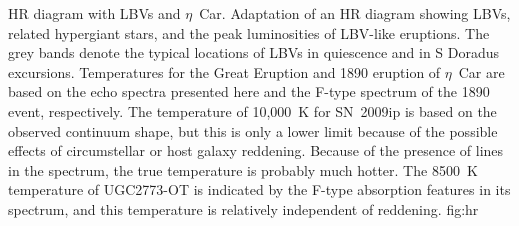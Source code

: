 {HR diagram with LBVs and $\eta$~Car.
Adaptation\cite{Smith04} of an HR diagram showing LBVs, related
hypergiant stars, and the peak luminosities of LBV-like eruptions. The
grey bands denote the typical locations of LBVs in quiescence and in S
Doradus excursions.  Temperatures for the Great Eruption and 1890
eruption of $\eta$~Car are based on the echo spectra presented here
and the F-type spectrum of the 1890 event\cite{Walborn77},
respectively.
The temperature of 10,000~K for SN~2009ip is based on the observed
continuum shape, but this is only a lower limit because of the
possible effects of circumstellar or host galaxy
reddening\cite{Smith10}.  Because of the presence of  lines
in the spectrum, the true temperature is probably much hotter.
The 8500~K temperature of UGC2773-OT is indicated by the F-type
absorption features in its spectrum, and this temperature is
relatively independent of reddening\cite{Smith10,Foley11}.
}
{fig:hr}
